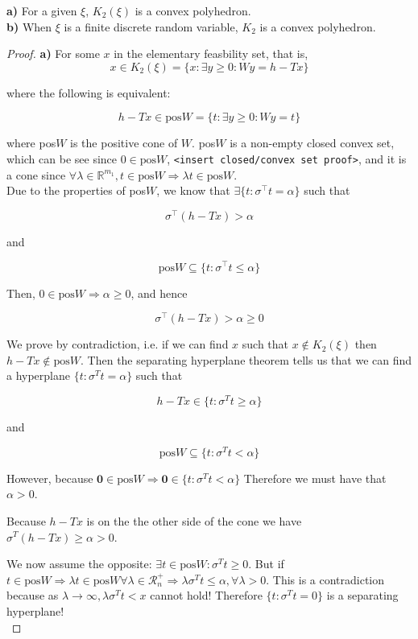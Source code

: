 \begin{thm}\hfill\break
{\bf a)} For a given $\xi$, $K_2(\xi)$ is a convex polyhedron.\\
{\bf b)} When $\xi$ is a finite discrete random variable, $K_2$ is a convex polyhedron.
\end{thm}

\begin{proof}\hfill\break
{\bf a)} For some $x$ in the elementary feasbility set, that is,
\[
x \in K_2(\xi) = \big\{ x : \exists y \geq 0 : W y = h - Tx \big\}
\]

where the following is equivalent:

\[
h-Tx \in \text{pos}W = \big\{ t : \exists y \geq 0 : W y = t \big\}
\]

where pos$W$ is the positive cone of $W$. pos$W$ is a non-empty closed convex set, which
can be see since $0\in \text{pos}W$, \texttt{<insert closed/convex set proof>}, and it is
a cone since $\forall \lambda \in \mathbb{R}^{m_1}, t\in \text{pos}W \Rightarrow \lambda t \in
\text{pos}W$.\\

Due to the properties of pos$W$, we know that $\exists \{t : \sigma^\top t = \alpha\}$ such
that

\[
\sigma^\top (h-Tx) > \alpha
\]

and

\[
\text{pos}W \subseteq \{t : \sigma^\top t \leq \alpha\}
\]

Then, $0\in \text{pos}W \Rightarrow \alpha \geq 0$, and hence

\[
\sigma^\top (h-Tx) > \alpha \geq 0
\]

We prove by contradiction, i.e. if we can find $x$ such that $x\notin K_2(\xi)$ then
$h - Tx \notin \text{pos}W$. Then the separating hyperplane theorem tells us that we
can find a hyperplane $\big\{ t : \sigma^T t = \alpha \big\}$ such that

\[
h-Tx \in \big\{ t : \sigma^T t \geq \alpha \big\}
\]

and

\[
\text{pos}W \subseteq \big\{ t : \sigma^T t < \alpha \big\}
\]

However, because $\bm{0} \in \text{pos}W \Rightarrow \bm{0} \in \big\{ t : \sigma^T t < \alpha \big\}$
Therefore we must have that $\alpha > 0$.

Because $h-Tx$ is on the the other side of the cone we have $\sigma^T (h-Tx) \geq \alpha > 0$.


We now assume the opposite: $\exists t\in \text{pos}W : \sigma^T t\geq 0$. But
if $t\in \text{pos}W \Rightarrow \lambda t\in \text{pos}W \forall \lambda \in \mathcal{R}_n^+
\Rightarrow \lambda \sigma^T t \leq \alpha, \forall \lambda > 0$. This is a contradiction
because as $\lambda \rightarrow \infty, \lambda \sigma^T t < x$ cannot hold!
Therefore $\{ t: \sigma^T t = 0\}$ is a separating hyperplane!\\


\end{proof}
